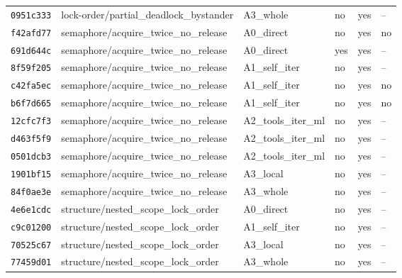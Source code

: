 \begin{tabular}{llllll}
\texttt{0951c333} & lock-order/partial\_deadlock\_bystander & A3\_whole & no & yes & -- \\
\texttt{f42afd77} & semaphore/acquire\_twice\_no\_release & A0\_direct & no & yes & no \\
\texttt{691d644c} & semaphore/acquire\_twice\_no\_release & A0\_direct & yes & yes & -- \\
\texttt{8f59f205} & semaphore/acquire\_twice\_no\_release & A1\_self\_iter & no & yes & -- \\
\texttt{c42fa5ec} & semaphore/acquire\_twice\_no\_release & A1\_self\_iter & no & yes & no \\
\texttt{b6f7d665} & semaphore/acquire\_twice\_no\_release & A1\_self\_iter & no & yes & no \\
\texttt{12cfc7f3} & semaphore/acquire\_twice\_no\_release & A2\_tools\_iter\_ml & no & yes & -- \\
\texttt{d463f5f9} & semaphore/acquire\_twice\_no\_release & A2\_tools\_iter\_ml & no & yes & -- \\
\texttt{0501dcb3} & semaphore/acquire\_twice\_no\_release & A2\_tools\_iter\_ml & no & yes & -- \\
\texttt{1901bf15} & semaphore/acquire\_twice\_no\_release & A3\_local & no & yes & -- \\
\texttt{84f0ae3e} & semaphore/acquire\_twice\_no\_release & A3\_whole & no & yes & -- \\
\texttt{4e6e1cdc} & structure/nested\_scope\_lock\_order & A0\_direct & no & yes & -- \\
\texttt{c9c01200} & structure/nested\_scope\_lock\_order & A1\_self\_iter & no & yes & -- \\
\texttt{70525c67} & structure/nested\_scope\_lock\_order & A3\_local & no & yes & -- \\
\texttt{77459d01} & structure/nested\_scope\_lock\_order & A3\_whole & no & yes & -- \\
\bottomrule
\end{tabular}
